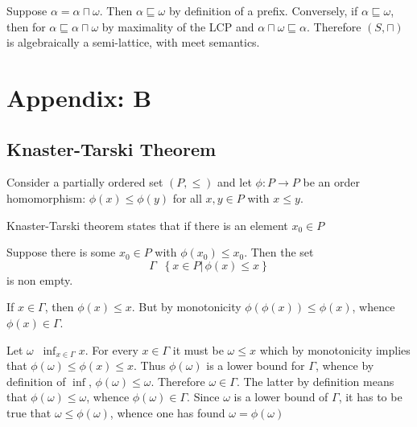 \documentclass[a4paper]{article}
\newcommand{\obj}[1]{{\left\{ #1 \right \}}}
\newcommand{\brac}[1]{{\left ( #1 \right )}}
\newcommand{\induc}[1]{{\left . #1 \right \vert}}
\newcommand{\defn}{\mathop{\overset{\Delta}{=}}\nolimits}
\begin{document}
Suppose $\alpha = \alpha\sqcap\omega$. Then $\alpha\sqsubseteq \omega$ by definition of a prefix. Conversely, if $\alpha\sqsubseteq \omega$, then for $\alpha\sqsubseteq \alpha\sqcap\omega$ by maximality of the LCP and $\alpha\sqcap\omega\sqsubseteq\alpha$. Therefore $(S,\sqcap)$ is algebraically a semi-lattice, with meet semantics.






\section{Appendix: B} %
\label{sec:appendix_b}

\subsection{Knaster-Tarski Theorem} %
\label{sub:knaster_tarski_theorem}

Consider a partially ordered set $(P,\leq)$ and let $\phi:P\to P$ be an order homomorphism: $\phi(x) \leq \phi(y)$ for all $x,y\in P$ with $x\leq y$.

Knaster-Tarski theorem states that if there is an element $x_0\in P$

Suppose there is some $x_0\in P$ with $\phi(x_0)\leq x_0$. Then the set \[\Gamma \defn \obj{ \induc{x\in P}\,\phi(x)\leq x}\] is non empty.

If $x\in \Gamma$, then $\phi(x)\leq x$. But by monotonicity $\phi\brac{\phi(x)}\leq \phi(x)$, whence $\phi(x)\in \Gamma$.

Let $\omega \defn \inf_{x\in \Gamma} x$. For every $x\in \Gamma$ it must be $\omega\leq x$ which by monotonicity implies that $\phi(\omega)\leq \phi(x)\leq x$. Thus $\phi(\omega)$ is a lower bound for $\Gamma$, whence by definition of $\inf$, $\phi(\omega)\leq \omega$. Therefore $\omega\in \Gamma$. The latter by definition means that $\phi(\omega)\leq \omega$, whence $\phi(\omega)\in \Gamma$. Since $\omega$ is a lower bound of $\Gamma$, it has to be true that $\omega \leq \phi(\omega)$, whence one has found $\omega = \phi(\omega)$


\end{document}
